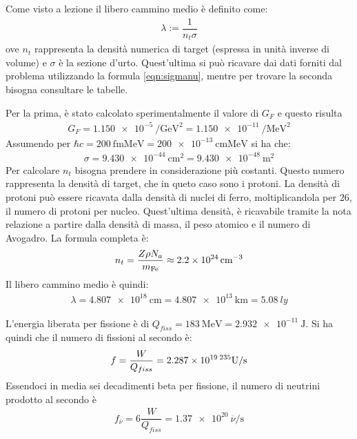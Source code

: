 \documentclass[../main.tex]{subfiles}
\begin{document}
	\begin{svol}
		Come visto a lezione il libero cammino medio è definito come:
		\begin{gather}
		\label{eqn:libcammdef}
		\lambda:=\dfrac{1}{n_{t}\sigma}
		\end{gather}
		ove $ n_{t} $ rappresenta la densità numerica di target (espressa in unità inverse di volume) e $ \sigma $ è la sezione d'urto. Quest'ultima si può ricavare dai dati forniti dal problema utilizzando la formula \ref{eqn:sigmanu}, mentre per trovare la seconda bisogna consultare le tabelle. 
		
		Per la prima, è stato calcolato sperimentalmente il valore di $ G_{F} $ e questo risulta 
		\begin{gather}
			G_{F}=\SI{1.150e-5}{\per\giga\electronvolt\squared}=\SI{1.150e-11}{\per\mega\electronvolt\squared}
		\end{gather}
		Assumendo per $ \hbar c = \SI{200}{\femto\meter\mega\electronvolt}=\SI{200e-13}{\centi\meter\mega\electronvolt} $ si ha che:
		\begin{gather}
			\sigma=\SI{9.430e-44}{\centi\meter\squared}=\SI{9.430e-48}{\meter\squared}
		\end{gather} 
		Per calcolare $ n_{t} $ bisogna prendere in considerazione più costanti. Questo numero rappresenta la densità di target, che in queto caso sono i protoni. La densità di protoni può essere ricavata dalla densità di nuclei di ferro, moltiplicandola per 26, il numero di protoni per nucleo. Quest'ultima densità, è ricavabile tramite la nota relazione a partire dalla densità di massa, il peso atomico e il numero di Avogadro. La formula completa è:
		\begin{gather}
		n_{t}=\dfrac{Z\rho N_{a}}{m_{\mathrm{Fe}}}\approx\SI{2.2e24}{\per\centi\meter\cubed}
		\end{gather}
		Il libero cammino medio è quindi:
		\begin{gather}
		\lambda=\SI{4.807e18}{\centi\meter}=\SI{4.807e13}{\kilo\meter}=\SI{5.08}{ly}
		\end{gather}
		
		
		L'energia liberata per fissione è di $ Q_{fiss}=\SI{183}{\mega\electronvolt}=\SI{2.932e-11}{\joule} $. Si ha quindi che il numero di fissioni al secondo è:
		\begin{gather*}
		f=\dfrac{W}{Q_{fiss}}=\SI{2.287e19}{\ensuremath{\mathrm{^{235}U}}\per\second}
		\end{gather*}
		Essendoci in media sei decadimenti beta per fissione, il numero di neutrini prodotto al secondo è
		\begin{gather}
			f_{\overline{\nu}}=6\dfrac{W}{Q_{fiss}}=\SI{1.37e20}{\overline{\nu}\per\second}
		\end{gather}
		

\end{svol}
\end{document}
